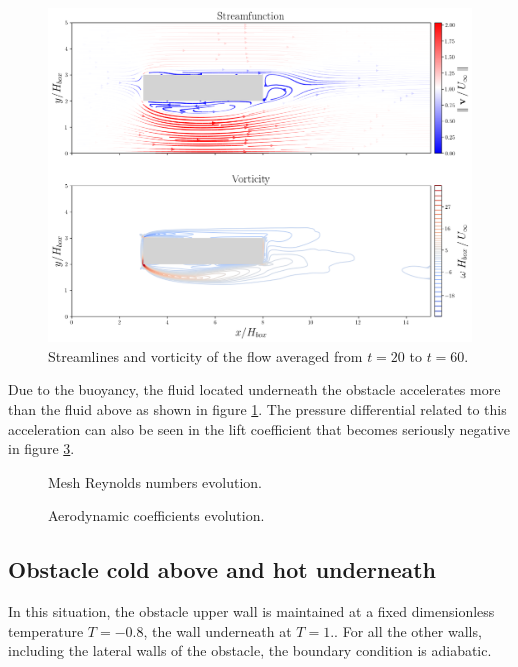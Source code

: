 \documentclass[11 pt]{article}
\begin{document}
\begin{figure}[H]
    \centering
    \includegraphics[width=\textwidth]{../figures/avg_flow_hot_box.png}
    \caption{Streamlines and vorticity of the flow averaged from $t=20$ to $t=60$.}
    \label{fig:averaging_hot_box}
\end{figure}

Due to the buoyancy, the fluid located underneath the obstacle accelerates more than the fluid above as shown in figure \ref{fig:averaging_hot_box}. The pressure differential related to this acceleration can also be seen in the lift coefficient that becomes seriously negative in figure \ref{fig:drag_hot_box}.

\begin{figure}[H]
    \centering
    
    \caption{Mesh Reynolds numbers evolution.}
    \label{fig:mesh_re_hot_box}
\end{figure}

\begin{figure}[H]
    \centering
    
    \caption{Aerodynamic coefficients evolution.}
    \label{fig:drag_hot_box}
\end{figure}

\subsection{Obstacle cold above and hot underneath}
In this situation, the obstacle upper wall is maintained at a fixed dimensionless temperature $T=-0.8$, the wall underneath at $T=1.$. For all the other walls, including the lateral walls of the obstacle, the boundary condition is adiabatic.
\end{document}
